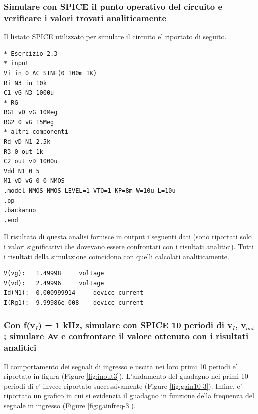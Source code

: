 \documentclass[a4paper,10pt]{article}
\begin{document}
\newpage
\subsubsection{Simulare con SPICE il punto operativo del circuito e verificare i valori trovati analiticamente}
Il listato SPICE utilizzato per simulare il circuito e' riportato di seguito.
\begin{verbatim}
* Esercizio 2.3
* input
Vi in 0 AC SINE(0 100m 1K)
Ri N3 in 10k
C1 vG N3 1000u
* RG
RG1 vD vG 10Meg
RG2 0 vG 15Meg
* altri componenti
Rd vD N1 2.5k
R3 0 out 1k
C2 out vD 1000u
Vdd N1 0 5
M1 vD vG 0 0 NMOS
.model NMOS NMOS LEVEL=1 VTO=1 KP=8m W=10u L=10u
.op
.backanno
.end
\end{verbatim}
Il risultato di questa analisi fornisce in output i seguenti dati (sono riportati solo i valori significativi che dovevano essere confrontati con i risultati analitici). Tutti i risultati della simulazione coincidono con quelli calcolati analiticamente.
\begin{verbatim}
V(vg):	 1.49998	 voltage
V(vd):	 2.49996	 voltage
Id(M1):	 0.000999914	 device_current
I(Rg1):	 9.99986e-008	 device_current
\end{verbatim}
\newpage

\subsubsection{Con f(v$_I$) = 1 kHz, simulare con SPICE 10 periodi di v$_I$, v$_{out}$; simulare Av e confrontare il valore ottenuto con i risultati analitici}
Il comportamento dei segnali di ingresso e uscita nei loro primi 10 periodi e' riportato in figura (Figure \ref{fig:inout3}). L'andamento del guadagno nei primi 10 periodi di e' invece riportato successivamente (Figure \ref{fig:gain10-3}). Infine, e' riportato un grafico in cui si evidenzia il guadagno in funzione della frequenza del segnale in ingresso (Figure \ref{fig:gainfreq-3}).
\end{document}
